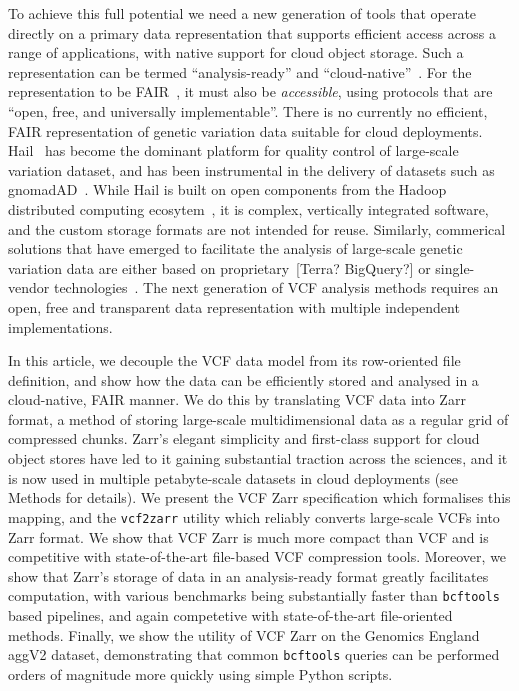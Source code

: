 \documentclass[a4paper,num-refs]{oup-contemporary}
\begin{document}
To achieve this full potential we 
need a new generation of tools that operate directly
on a primary data representation that supports 
efficient access across a range of applications,
with native support for cloud object storage.
Such a representation can be termed ``analysis-ready''
and ``cloud-native''~\citep{abernathey2021cloud}.
For the representation to be FAIR~\citep{wilkinson2016fair},
it must also be \emph{accessible}, using protocols that are 
``open, free, and universally implementable''.
There is no currently no efficient, FAIR representation of genetic variation
data suitable for cloud deployments.
Hail~\cite{ganna2016ultra,hail2024} has become the dominant platform
for quality control of large-scale variation dataset, 
and has been instrumental in the delivery of datasets such as 
gnomadAD~\cite{karczewski2020mutational,chen2024genomic}.
While Hail is built on open components
from the Hadoop distributed computing ecosytem~\citep{white2012hadoop},
it is complex, vertically integrated software,
and the custom storage formats are not intended for reuse.
Similarly, commerical solutions that have emerged to facilitate
the analysis of large-scale genetic variation data are either
based on proprietary~[Terra? BigQuery?]
or single-vendor technologies~\cite[e.g.][]{tiledb2024}.
The next generation of VCF analysis methods requires
an open, free and transparent data representation 
with multiple independent implementations.

In this article, we decouple the VCF data model from its row-oriented
file definition, and show how the data can be 
efficiently stored and analysed in a cloud-native, FAIR manner.
We do this by translating VCF data into Zarr format,
a method of storing large-scale multidimensional data as a regular
grid of compressed chunks. 
Zarr's elegant simplicity and first-class support for 
cloud object stores have led to 
it gaining substantial traction
across the sciences, and it is now used in multiple petabyte-scale
datasets in cloud deployments (see Methods for details).
We present the VCF Zarr specification which formalises this 
mapping, and the \texttt{vcf2zarr} 
utility which reliably converts large-scale VCFs into Zarr 
format. We show that VCF Zarr is much more compact than 
VCF and is competitive with state-of-the-art
file-based VCF compression tools. 
Moreover, we show that Zarr's storage of data in an analysis-ready 
format greatly facilitates computation,
with various benchmarks being substantially faster than
\texttt{bcftools} based pipelines, and again competetive
with state-of-the-art file-oriented methods. Finally, we show the 
utility of VCF Zarr on the Genomics England aggV2 dataset,
demonstrating that common \texttt{bcftools} queries can be performed orders
of magnitude more quickly using simple Python scripts.
\end{document}
